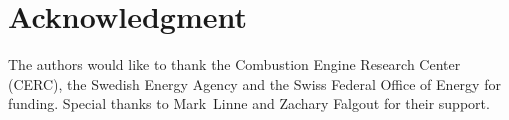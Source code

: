 \documentclass[letterpaper,twocolumn,10pt]{ilass}
\begin{document}
\section*{Acknowledgment}
The authors would like to thank the Combustion Engine Research Center (CERC),
the Swedish Energy Agency and the Swiss Federal Office of Energy for funding.
Special thanks to Mark~Linne and Zachary Falgout for their support.
\newline



\end{document}
